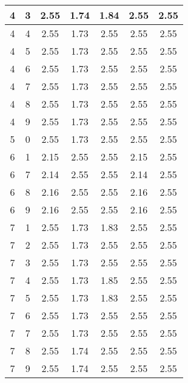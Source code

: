 \begin{longtable}{|c|c||c||c|c||c|c|}
	4 & 3 & 2.55 & 1.74 & 1.84 & 2.55 & 2.55 \\ \hline
	4 & 4 & 2.55 & 1.73 & 2.55 & 2.55 & 2.55 \\ \hline
	4 & 5 & 2.55 & 1.73 & 2.55 & 2.55 & 2.55 \\ \hline
	4 & 6 & 2.55 & 1.73 & 2.55 & 2.55 & 2.55 \\ \hline
	4 & 7 & 2.55 & 1.73 & 2.55 & 2.55 & 2.55 \\ \hline
	4 & 8 & 2.55 & 1.73 & 2.55 & 2.55 & 2.55 \\ \hline
	4 & 9 & 2.55 & 1.73 & 2.55 & 2.55 & 2.55 \\ \hline
	5 & 0 & 2.55 & 1.73 & 2.55 & 2.55 & 2.55 \\ \hline
	6 & 1 & 2.15 & 2.55 & 2.55 & 2.15 & 2.55 \\ \hline
	6 & 7 & 2.14 & 2.55 & 2.55 & 2.14 & 2.55 \\ \hline
	6 & 8 & 2.16 & 2.55 & 2.55 & 2.16 & 2.55 \\ \hline
	6 & 9 & 2.16 & 2.55 & 2.55 & 2.16 & 2.55 \\ \hline
	7 & 1 & 2.55 & 1.73 & 1.83 & 2.55 & 2.55 \\ \hline
	7 & 2 & 2.55 & 1.73 & 2.55 & 2.55 & 2.55 \\ \hline
	7 & 3 & 2.55 & 1.73 & 2.55 & 2.55 & 2.55 \\ \hline
	7 & 4 & 2.55 & 1.73 & 1.85 & 2.55 & 2.55 \\ \hline
	7 & 5 & 2.55 & 1.73 & 1.83 & 2.55 & 2.55 \\ \hline
	7 & 6 & 2.55 & 1.73 & 2.55 & 2.55 & 2.55 \\ \hline
	7 & 7 & 2.55 & 1.73 & 2.55 & 2.55 & 2.55 \\ \hline
	7 & 8 & 2.55 & 1.74 & 2.55 & 2.55 & 2.55 \\ \hline
	7 & 9 & 2.55 & 1.74 & 2.55 & 2.55 & 2.55 \\ \hline
\end{longtable}
\clearpage{}
